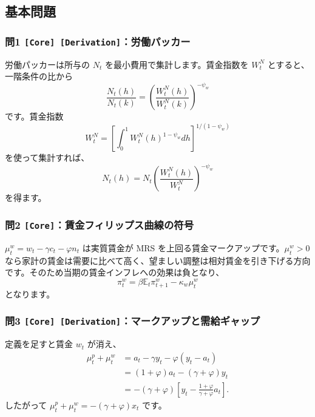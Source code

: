 \documentclass[
  japanese,
  lualatex,
  ja=standard,
  11pt,
  a4paper]{ltjsarticle}
\begin{document}
\subsection{基本問題}\label{ux57faux672cux554fux984c-9}

\subsubsection{\texorpdfstring{問1
\texttt{{[}Core{]}\ {[}Derivation{]}}：労働パッカー}{問1 {[}Core{]} {[}Derivation{]}：労働パッカー}}\label{ux554f1-core-derivationux52b4ux50cdux30d1ux30c3ux30abux30fc}

労働パッカーは所与の \(N_t\) を最小費用で集計します。賃金指数を
\(W_t^N\) とすると、一階条件の比から \[
\frac{N_t(h)}{N_t(k)}
=\left(\frac{W_t^N(h)}{W_t^N(k)}\right)^{-\psi_w}
\] です。賃金指数 \[
W_t^N
=\left[\int_0^1W_t^N(h)^{1-\psi_w}dh\right]^{1/(1-\psi_w)}
\] を使って集計すれば、 \[
N_t(h)=N_t\left(\frac{W_t^N(h)}{W_t^N}\right)^{-\psi_w}
\] を得ます。

\subsubsection{\texorpdfstring{問2
\texttt{{[}Core{]}}：賃金フィリップス曲線の符号}{問2 {[}Core{]}：賃金フィリップス曲線の符号}}\label{ux554f2-coreux8cc3ux91d1ux30d5ux30a3ux30eaux30c3ux30d7ux30b9ux66f2ux7ddaux306eux7b26ux53f7}

\(\mu_t^w=w_t-\gamma c_t-\varphi n_t\) は実質賃金が MRS
を上回る賃金マークアップです。\(\mu_t^w>0\)
なら家計の賃金は需要に比べて高く、望ましい調整は相対賃金を引き下げる方向です。そのため当期の賃金インフレへの効果は負となり、
\[
\pi_t^w=\beta\mathbb E_t\pi_{t+1}^w-\kappa_w\mu_t^w
\] となります。

\subsubsection{\texorpdfstring{問3
\texttt{{[}Core{]}\ {[}Derivation{]}}：マークアップと需給ギャップ}{問3 {[}Core{]} {[}Derivation{]}：マークアップと需給ギャップ}}\label{ux554f3-core-derivationux30deux30fcux30afux30a2ux30c3ux30d7ux3068ux9700ux7d66ux30aeux30e3ux30c3ux30d7}

定義を足すと賃金 \(w_t\) が消え、 \[
\begin{aligned}
\mu_t^p+\mu_t^w
&=a_t-\gamma y_t-\varphi(y_t-a_t)\\
&=(1+\varphi)a_t-(\gamma+\varphi)y_t\\
&=-(\gamma+\varphi)
\left[y_t-\frac{1+\varphi}{\gamma+\varphi}a_t\right].
\end{aligned}
\] したがって \(\mu_t^p+\mu_t^w=-(\gamma+\varphi)x_t\) です。
\end{document}
